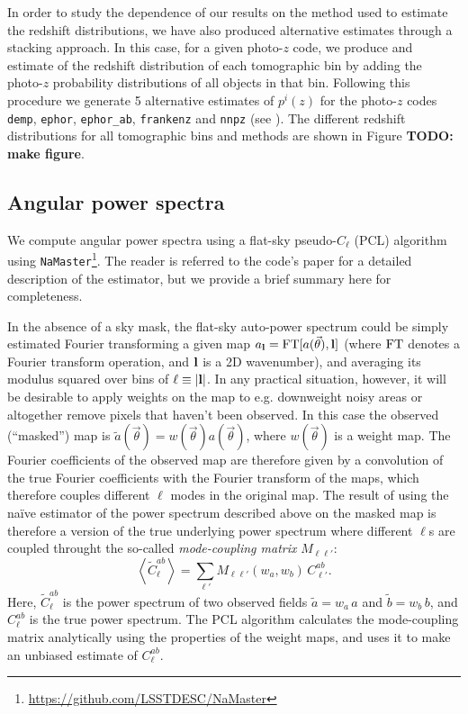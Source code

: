 \documentclass[a4paper,11pt]{article}
\newcommand{\nv}{\vec{\theta}}
\newcommand{\todo}[1]{{\bf TODO: #1}}
\begin{document}
    In order to study the dependence of our results on the method used to estimate the redshift distributions, we have also produced alternative estimates through a stacking approach. In this case, for a given photo-$z$ code, we produce and estimate of the redshift distribution of each tomographic bin by adding the photo-$z$ probability distributions of all objects in that bin. Following this procedure we generate 5 alternative estimates of $p^i(z)$ for the photo-$z$ codes {\tt demp}, {\tt ephor}, {\tt ephor\_ab}, {\tt frankenz} and {\tt nnpz} (see \cite{2018PASJ...70S...9T}). The different redshift distributions for all tomographic bins and methods are shown in Figure \todo{make figure}.

  \subsection{Angular power spectra}\label{ssec:methods.cell}
    We compute angular power spectra using a flat-sky pseudo-$C_\ell$ (PCL) algorithm \citep{2002ApJ...567....2H} using {\tt NaMaster}\footnote{\url{https://github.com/LSSTDESC/NaMaster}}. The reader is referred to the code's paper \cite{2019MNRAS.484.4127A} for a detailed description of the estimator, but we provide a brief summary here for completeness.
    
    In the absence of a sky mask, the flat-sky auto-power spectrum could be simply estimated Fourier transforming a given map $a_{\bf l}={\rm FT}[a(\nv),{\bf l}]$ (where ${\rm FT}$ denotes a Fourier transform operation, and ${\bf l}$ is a 2D wavenumber), and averaging its modulus squared over bins of $\ell\equiv|{\bf l}|$. In any practical situation, however, it will be desirable to apply weights on the map to e.g. downweight noisy areas or altogether remove pixels that haven't been observed. In this case the observed (``masked'') map is $\tilde{a}(\nv)=w(\nv)a(\nv)$, where $w(\nv)$ is a weight map. The Fourier coefficients of the observed map are therefore given by a convolution of the true Fourier coefficients with the Fourier transform of the maps, which therefore couples different $\ell$ modes in the original map. The result of using the na\"ive estimator of the power spectrum described above on the masked map is therefore a version of the true underlying power spectrum where different $\ell$s are coupled throught the so-called {\sl mode-coupling matrix} $M_{\ell\ell'}$:
    \begin{equation}
      \left\langle \tilde{C}^{ab}_\ell \right\rangle = \sum_{\ell'} M_{\ell\ell'}(w_a,w_b)\,C^{ab}_{\ell'}.
    \end{equation}
    Here, $\tilde{C}^{ab}_\ell$ is the power spectrum of two observed fields $\tilde{a}=w_a\,a$ and $\tilde{b}=w_b\,b$, and $C^{ab}_\ell$ is the true power spectrum. The PCL algorithm calculates the mode-coupling matrix analytically using the properties of the weight maps, and uses it to make an unbiased estimate of $C^{ab}_\ell$.
    
\end{document}
